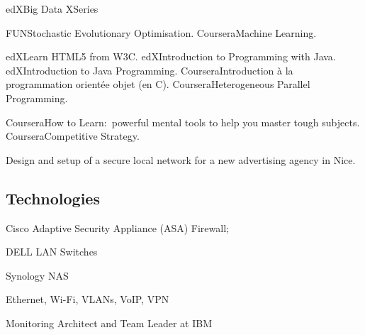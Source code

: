 
   {edX}{Big Data XSeries}

   {FUN}{Stochastic Evolutionary Optimisation.}
   {Coursera}{Machine Learning.}

   
   {edX}{Learn HTML5 from W3C.}
   {edX}{Introduction to Programming with Java.}
   {edX}{Introduction to Java Programming.}
   {Coursera}{Introduction \`a la programmation orient\'ee objet (en C\plusplus).}
   {Coursera}{Heterogeneous Parallel Programming.}


   {Coursera}{How to Learn:~powerful mental tools to help you master tough subjects.}
   {Coursera}{Competitive Strategy.}


\bigskip
{}

\noindent
Design and setup of a secure local network for a new advertising agency in Nice.

\subsection{Technologies}

\item{\bdot} Cisco Adaptive Security Appliance (ASA) Firewall;
\item{\bdot} DELL LAN Switches
\item{\bdot} Synology NAS
\item{\bdot} Ethernet, Wi-Fi, VLANs, VoIP, VPN


\bigskip
{}
{Monitoring Architect and Team Leader at IBM}

